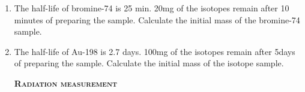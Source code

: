 \documentclass[main.tex]{subfiles}
\begin{document}
\begin{multicols*}{2}
\begin{enumerate}
\item  The half-life of bromine-74 is 25 min. 20mg of the isotopes remain after 10 minutes of preparing the sample. Calculate the initial mass of the bromine-74 sample.
\begin{enumerate}[label=(\alph*)]
\end{enumerate}

\item  The half-life of Au-198 is 2.7 days. 100mg of the isotopes remain after 5days of preparing the sample. Calculate the initial mass of the isotope sample.
\begin{enumerate}[label=(\alph*)]
\end{enumerate}




{\raggedright\textsc{\textbf{Radiation measurement}}\par}



\end{enumerate}
\end{multicols*}
\end{document}

